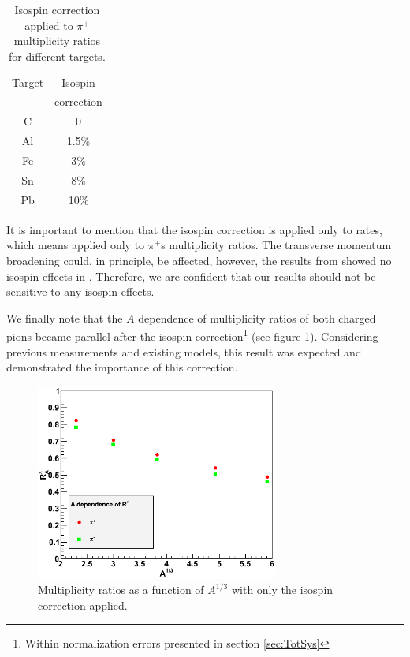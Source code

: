 \begin{table}[htbp]
  \centering
  \begin{tabular}{@{} cc @{}}
    \hline
    Target & Isospin  \\ 
           & correction \\ 
    \hline
    C & 0 \\
    Al & 1.5\%\\
    Fe &  3\% \\
    Sn &  8\%\\
    Pb &  10\% \\
    \hline
  \end{tabular}
  \caption{Isospin correction applied to $\pi^+$ multiplicity ratios for different targets.}
  \label{tab:isospin}
\end{table}

It is important to mention that the isospin correction is applied only to rates, which means applied only to $\pi^+$s multiplicity ratios. The transverse momentum broadening could, in principle, be affected, however, the results from \cite{Asaturyan:2011mq} showed no isospin effects in \ptp. Therefore, we are confident that our \dpt results should not be sensitive to any isospin effects.

We finally note that the $A$ dependence of multiplicity ratios of both charged pions became parallel after the isospin correction\footnote{Within 
normalization errors presented in section \ref{sec:TotSys}} (see figure 
\ref{fig:IsoPlot}). Considering previous measurements and existing models, 
this result was expected and demonstrated the importance of this correction.

\begin{figure}[tbp]
\centering
\includegraphics[width=8cm] {chap5-fig/c_RvA.png}
\caption {Multiplicity ratios as a function of $A^{1/3}$ 
with only the isospin correction applied.}
\label{fig:IsoPlot}
\end{figure}


